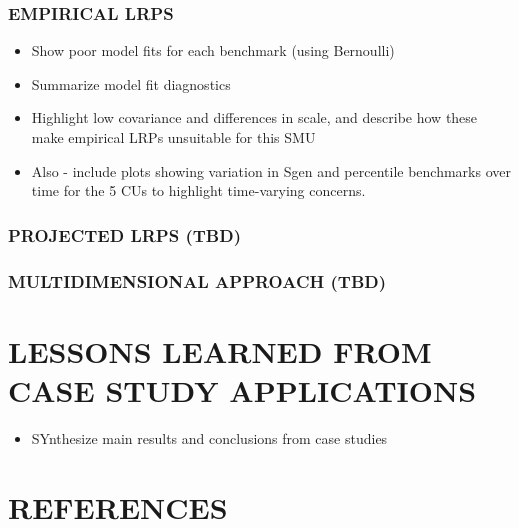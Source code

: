 \documentclass[11pt]{book}
\begin{document}
\hypertarget{empirical-lrps-3}{%
\subsubsection{EMPIRICAL LRPS}\label{empirical-lrps-3}}
\begin{itemize}

\item
  Show poor model fits for each benchmark (using Bernoulli)
\item
  Summarize model fit diagnostics
\item
  Highlight low covariance and differences in scale, and describe how these make empirical LRPs unsuitable for this SMU
\item
  Also - include plots showing variation in Sgen and percentile benchmarks over time for the 5 CUs to highlight time-varying concerns.
\end{itemize}
\hypertarget{projected-lrps-tbd-1}{%
\subsubsection{PROJECTED LRPS (TBD)}\label{projected-lrps-tbd-1}}

\hypertarget{multidimensional-approach-tbd-1}{%
\subsubsection{MULTIDIMENSIONAL APPROACH (TBD)}\label{multidimensional-approach-tbd-1}}

\hypertarget{lessons-learned-from-case-study-applications}{%
\section{LESSONS LEARNED FROM CASE STUDY APPLICATIONS}\label{lessons-learned-from-case-study-applications}}
\begin{itemize}

\item
  SYnthesize main results and conclusions from case studies
\end{itemize}
\clearpage

\hypertarget{references}{%
\section{REFERENCES}\label{references}}

\noindent
\vspace{-2em}
\setlength{\parindent}{-0.2in}
\setlength{\leftskip}{0.2in}
\setlength{\parskip}{8pt}
\end{document}
